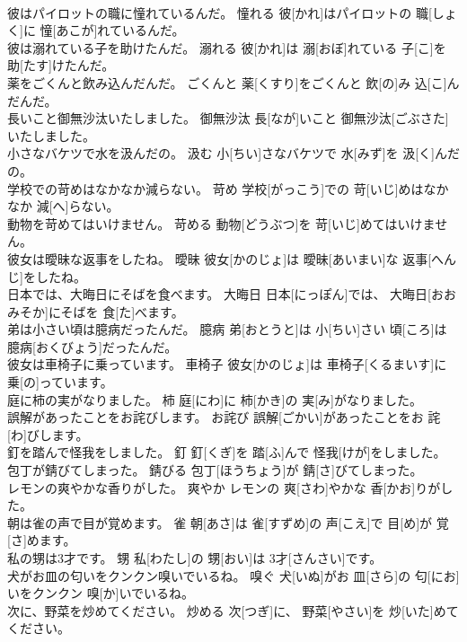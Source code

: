 \documentclass[8pt]{extreport}
\begin{document}
\begin{CJK}{UTF8}{min}
\\	彼はパイロットの職に憧れているんだ。	憧れる	彼[かれ]はパイロットの 職[しょく]に 憧[あこが]れているんだ。	
\\	彼は溺れている子を助けたんだ。	溺れる	彼[かれ]は 溺[おぼ]れている 子[こ]を 助[たす]けたんだ。	
\\	薬をごくんと飲み込んだんだ。	ごくんと	薬[くすり]をごくんと 飲[の]み 込[こ]んだんだ。	
\\	長いこと御無沙汰いたしました。	御無沙汰	長[なが]いこと 御無沙汰[ごぶさた]いたしました。	
\\	小さなバケツで水を汲んだの。	汲む	小[ちい]さなバケツで 水[みず]を 汲[く]んだの。	
\\	学校での苛めはなかなか減らない。	苛め	学校[がっこう]での 苛[いじ]めはなかなか 減[へ]らない。	
\\	動物を苛めてはいけません。	苛める	動物[どうぶつ]を 苛[いじ]めてはいけません。	
\\	彼女は曖昧な返事をしたね。	曖昧	彼女[かのじょ]は 曖昧[あいまい]な 返事[へんじ]をしたね。	
\\	日本では、大晦日にそばを食べます。	大晦日	日本[にっぽん]では、 大晦日[おおみそか]にそばを 食[た]べます。	
\\	弟は小さい頃は臆病だったんだ。	臆病	弟[おとうと]は 小[ちい]さい 頃[ころ]は 臆病[おくびょう]だったんだ。	
\\	彼女は車椅子に乗っています。	車椅子	彼女[かのじょ]は 車椅子[くるまいす]に 乗[の]っています。	
\\	庭に柿の実がなりました。	柿	庭[にわ]に 柿[かき]の 実[み]がなりました。	
\\	誤解があったことをお詫びします。	お詫び	誤解[ごかい]があったことをお 詫[わ]びします。	
\\	釘を踏んで怪我をしました。	釘	釘[くぎ]を 踏[ふ]んで 怪我[けが]をしました。	
\\	包丁が錆びてしまった。	錆びる	包丁[ほうちょう]が 錆[さ]びてしまった。	
\\	レモンの爽やかな香りがした。	爽やか	レモンの 爽[さわ]やかな 香[かお]りがした。	
\\	朝は雀の声で目が覚めます。	雀	朝[あさ]は 雀[すずめ]の 声[こえ]で 目[め]が 覚[さ]めます。	
\\	私の甥は3才です。	甥	私[わたし]の 甥[おい]は 3才[さんさい]です。	
\\	犬がお皿の匂いをクンクン嗅いでいるね。	嗅ぐ	犬[いぬ]がお 皿[さら]の 匂[にお]いをクンクン 嗅[か]いでいるね。	
\\	次に、野菜を炒めてください。	炒める	次[つぎ]に、 野菜[やさい]を 炒[いた]めてください。	

\end{CJK}
\end{document}
